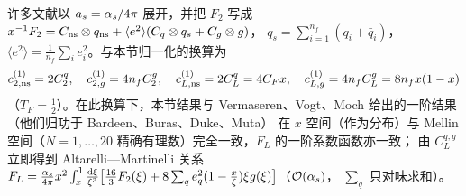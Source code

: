 许多文献以 $a_s=\alpha_s/4\pi$ 展开，并把 $F_2$ 写成
$x^{-1}F_2=C_{\rm ns}\otimes q_{\rm ns}+\langle e^2\rangle(C_q\otimes q_s+C_g\otimes g)$，
$q_s=\sum_{i=1}^{n_f}(q_i+\bar q_i)$，$\langle e^2\rangle=\frac1{n_f}\sum_ie_i^2$。与本节归一化的换算为
\begin{equation}
c^{(1)}_{2,\rm ns}=2C_2^q,\quad c^{(1)}_{2,g}=4n_fC_2^g,\quad c^{(1)}_{L,\rm ns}=2C_L^q=4C_Fx,\quad c^{(1)}_{L,g}=4n_fC_L^g=8n_fx(1-x)
\end{equation}
（$T_F=\frac12$）。在此换算下，本节结果与 Vermaseren、Vogt、Moch 给出的一阶结果（他们归功于 Bardeen、Buras、Duke、Muta）
在 $x$ 空间（作为分布）与 Mellin 空间（$N=1,\dots,20$ 精确有理数）完全一致，$F_L$ 的一阶系数函数亦一致；
由 $C_L^{q,g}$ 立即得到 Altarelli—Martinelli 关系
$F_L=\frac{\alpha_s}{4\pi}x^2\int_x^1\frac{\mathrm{d}\xi}{\xi^3}\big[\frac{16}{3}F_2(\xi)+8\sum_qe_q^2(1-\frac{x}{\xi})\xi g(\xi)\big]$（$\mathcal{O}\!\left(\alpha_s\right)$，
$\sum_q$ 只对味求和）。
